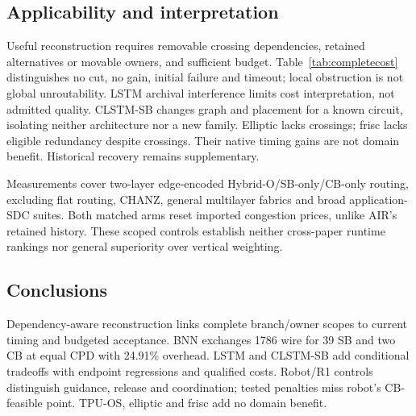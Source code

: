 \documentclass[conference,10pt]{IEEEtran}
\begin{document}
\subsection{Applicability and interpretation}
Useful reconstruction requires removable crossing dependencies, retained alternatives or movable owners, and sufficient budget. Table~\ref{tab:completecost} distinguishes no cut, no gain, initial failure and timeout; local obstruction is not global unroutability. LSTM archival interference limits cost interpretation, not admitted quality. CLSTM-SB changes graph and placement for a known circuit, isolating neither architecture nor a new family. Elliptic lacks crossings; frisc lacks eligible redundancy despite crossings. Their native timing gains are not domain benefit. Historical recovery remains supplementary.

Measurements cover two-layer edge-encoded Hybrid-O/SB-only/CB-only routing, excluding flat routing, CHANZ, general multilayer fabrics and broad application-SDC suites. Both matched arms reset imported congestion prices, unlike AIR's retained history. These scoped controls establish neither cross-paper runtime rankings nor general superiority over vertical weighting.

\subsection{Conclusions}
Dependency-aware reconstruction links complete branch/owner scopes to current timing and budgeted acceptance. BNN exchanges 1786 wire for 39 SB and two CB at equal CPD with 24.91\% overhead. LSTM and CLSTM-SB add conditional tradeoffs with endpoint regressions and qualified costs. Robot/R1 controls distinguish guidance, release and coordination; tested penalties miss robot's CB-feasible point. TPU-OS, elliptic and frisc add no domain benefit.


\end{document}
